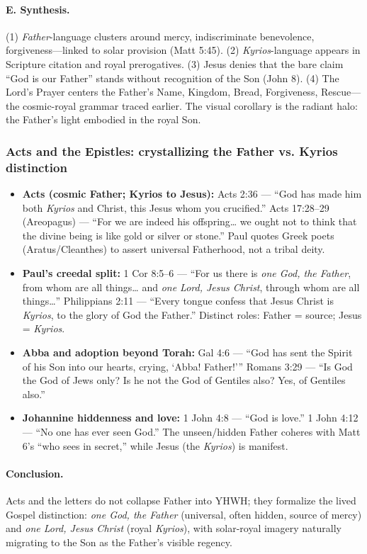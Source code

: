 \paragraph{E. Synthesis.}
(1) \emph{Father}-language clusters around mercy, indiscriminate benevolence, forgiveness---linked to solar provision (Matt 5:45). (2) \emph{Kyrios}-language appears in Scripture citation and royal prerogatives. (3) Jesus denies that the bare claim “God is our Father” stands without recognition of the Son (John 8). (4) The Lord’s Prayer centers the Father’s Name, Kingdom, Bread, Forgiveness, Rescue---the cosmic-royal grammar traced earlier. The visual corollary is the radiant halo: the Father’s light embodied in the royal Son.

\subsubsection{Acts and the Epistles: crystallizing the Father vs. Kyrios distinction}\label{subsubsec:acts-epistles-father-kyrios}
\begin{itemize}
    \item \textbf{Acts (cosmic Father; Kyrios to Jesus):} Acts 2:36 --- “God has made him both \emph{Kyrios} and Christ, this Jesus whom you crucified.” Acts 17:28--29 (Areopagus) --- “For we are indeed his offspring… we ought not to think that the divine being is like gold or silver or stone.” Paul quotes Greek poets (Aratus/Cleanthes) \cite[5]{aratus:phaenomena} to assert universal Fatherhood, not a tribal deity.
    \item \textbf{Paul’s creedal split:} 1 Cor 8:5--6 --- “For us there is \emph{one God, the Father}, from whom are all things… and \emph{one Lord, Jesus Christ}, through whom are all things…” Philippians 2:11 --- “Every tongue confess that Jesus Christ is \emph{Kyrios}, to the glory of God the Father.” Distinct roles: Father = source; Jesus = \emph{Kyrios}.
    \item \textbf{Abba and adoption beyond Torah:} Gal 4:6 --- “God has sent the Spirit of his Son into our hearts, crying, ‘Abba! Father!’” Romans 3:29 --- “Is God the God of Jews only? Is he not the God of Gentiles also? Yes, of Gentiles also.”
    \item \textbf{Johannine hiddenness and love:} 1 John 4:8 --- “God is love.” 1 John 4:12 --- “No one has ever seen God.” The unseen/hidden Father coheres with Matt 6’s “who sees in secret,” while Jesus (the \emph{Kyrios}) is manifest.
\end{itemize}
\paragraph{Conclusion.} Acts and the letters do not collapse Father into YHWH; they formalize the lived Gospel distinction: \emph{one God, the Father} (universal, often hidden, source of mercy) and \emph{one Lord, Jesus Christ} (royal \emph{Kyrios}), with solar-royal imagery naturally migrating to the Son as the Father’s visible regency.
